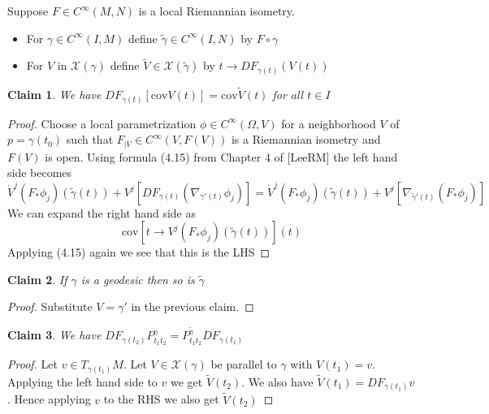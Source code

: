 \documentclass{article}
\newtheorem{claim}{Claim}
\begin{document}
Suppose $F \in C^\infty(M,N)$ is a local Riemannian isometry.

\begin{itemize}
  \item For $\gamma \in C^\infty(I,M)$ define $\tilde{\gamma} \in C^\infty(I,N)$ by $F \circ \gamma$
  \item For $V$ in $\mathcal{X}(\gamma)$ define $\tilde{V} \in \mathcal{X}(\tilde{\gamma})$ by $t \to DF_{\gamma(t)}(V(t))$
\end{itemize}

\begin{claim}
  We have $DF_{\gamma(t)}[\text{cov}V(t)]=\text{cov}\tilde{V}(t)$ for all $t \in I$
\end{claim}

\begin{proof}
  Choose a local parametrization $\phi \in C^\infty(\Omega,V)$ for a neighborhood $V$ of $p=\gamma(t_0)$ 
  such that $F_{|V} \in C^\infty(V,F(V))$ is a Riemannian isometry and $F(V)$ is open. Using formula (4.15) from Chapter 4 of [LeeRM] the left hand side becomes 
  \[\dot{V}^j(F_*\phi_j)(\tilde{\gamma}(t))+V^j [DF_{\gamma(t)}(\nabla_{\gamma'(t)}\phi_j)]=\dot{V}^j(F_*\phi_j)(\tilde{\gamma}(t))+V^j[\nabla_{\tilde{\gamma}'(t)}(F_*\phi_j)] \]
  We can expand the right hand side as 
  \[\text{cov}[t \to V^j(F_*\phi_j)(\tilde{\gamma}(t))](t)\]
  Applying (4.15) again we see that this is the LHS
\end{proof}

\begin{claim}
If $\gamma$ is a geodesic then so is $\tilde{\gamma}$
\end{claim}

\begin{proof}
  Substitute $V=\gamma'$ in the previous claim.
\end{proof}

\begin{claim}
We have $DF_{\gamma(t_2)}P_{t_1t_2}^\gamma=P_{t_1t_2}^{\tilde{\gamma}}DF_{\gamma(t_1)}$
\end{claim}

\begin{proof}
  Let $v \in T_{\gamma(t_1)}M$. Let $V \in \mathcal{X}(\gamma)$ be parallel to $\gamma$ with $V(t_1)=v$. 
  Applying the left hand side to $v$ we get $\tilde{V}(t_2)$. 
  We also have $\tilde{V}(t_1)=DF_{\gamma(t_1)}v$.
  Hence applying $v$ to the RHS we also get $\tilde{V}(t_2)$
\end{proof}
\end{document}
